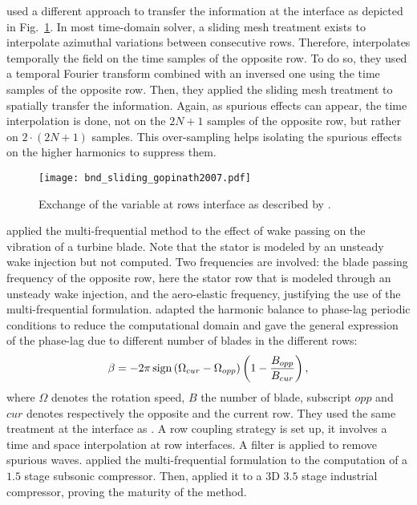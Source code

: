 \citet{Gopinath2007} used a different approach to transfer
the information at the interface as depicted
in Fig.~\ref{fig:bnd_sliding_gopinath2007}. In most time-domain solver,
a sliding mesh treatment exists to interpolate azimuthal variations
between consecutive rows. Therefore, \citet{Gopinath2007}
interpolates temporally the field on the time samples
of the opposite row. To do so, they used a temporal Fourier
transform combined with an inversed one using the time samples
of the opposite row.
Then, they applied the sliding mesh treatment
to spatially transfer the information. Again, as spurious effects
can appear, the time interpolation is done, not on the $2N+1$ samples
of the opposite row, but rather on $2\cdot (2N+1)$ samples. This over-sampling
helps isolating the spurious effects on the higher harmonics to suppress them.
\begin{figure}[htbp]
  \centering
  \texttt{[image: bnd\_sliding\_gopinath2007.pdf]}
  \caption{Exchange of the variable at rows interface as described by \citet{Gopinath2007}.}
  \label{fig:bnd_sliding_gopinath2007}
\end{figure}
\citet{Ekici2008a} applied the multi-frequential method
to the effect of wake passing on the vibration of
a turbine blade. Note that the stator is modeled
by an unsteady wake injection but not computed.
Two frequencies are involved: the blade passing
frequency of the opposite row, here the
stator row that is modeled through an unsteady wake injection,
and the aero-elastic frequency, justifying the use
of the multi-frequential formulation.
\citet{JSicot2012} adapted the harmonic balance 
to phase-lag periodic 
conditions to reduce the computational domain
and gave the general expression of the phase-lag due to
different number of blades in the different rows:
\begin{equation}
 	\beta = - 2 \pi \operatorname{sign} \left(\Omega_{cur} - \Omega_{opp} \right) 
 	\left(1 - \frac{B_{opp}}{B_{cur}}\right),
\end{equation} 
where $\Omega$ denotes the rotation speed, $B$ the number
of blade, subscript $opp$ and $cur$ denotes respectively the
opposite and the current row. They used the same treatment
at the interface as \citet{Gopinath2007}.
A row coupling strategy is set up, it involves 
a time and space interpolation at row interfaces.
A filter is applied to remove spurious waves.
\citet{JGuedeney2013} applied the multi-frequential
formulation to the computation of a $1.5$ stage subsonic
compressor.
Then, \citet{JSicot2013} applied it to a $3$D
$3.5$ stage industrial compressor, proving the maturity of
the method.


